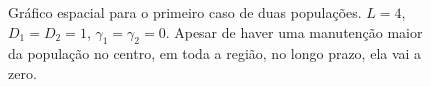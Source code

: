 \documentclass{article}
\begin{document}
	\begin{figure}[h]
		\centering
		\qquad
		\caption{Gráfico espacial para o primeiro caso de duas populações. $L=4$, $D_1 = D_2 = 1$, $\gamma_1 = \gamma_2 = 0$. Apesar de haver uma manutenção maior da população no centro, em toda a região, no longo prazo, ela vai a zero.}
		\label{fig:Two-P-02-Diffusion-Space}
	\end{figure}	
	
\end{document}
